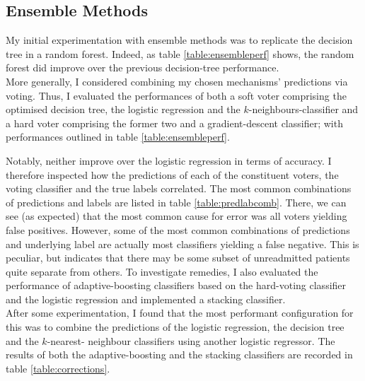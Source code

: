 \documentclass[10pt, twoside, a4paper]{article}
\begin{document}
	\subsection{Ensemble Methods}
	My initial experimentation with ensemble methods was to replicate the decision tree in a 
	random forest. Indeed, 
	as table \ref{table:ensembleperf} shows, the random forest did improve over the previous 
	decision-tree performance. \\
	More generally, I considered combining my chosen mechanisms' predictions 
	via voting. Thus, I evaluated the 
	performances of both a soft voter comprising the optimised decision tree, the logistic 
	regression and the $k$-neighbours-classifier and a hard voter comprising the former two 
	and a gradient-descent classifier; with performances outlined in table \ref{table:ensembleperf}. 

	Notably, neither improve over the logistic regression in terms of accuracy. 
	I therefore inspected how the predictions of each of the constituent voters, the voting 
	classifier and the true labels correlated. The most common combinations of 
	predictions and labels are listed in table \ref{table:predlabcomb}. There, we can see (as 
	expected) that the most common cause for error was all voters 
	yielding false positives. However, some of the most common 
	combinations of predictions and underlying label are actually most classifiers yielding a 
	false negative. This is peculiar, but indicates that there may be some subset of 
	unreadmitted patients quite separate from others. To 
	investigate remedies, I also evaluated the performance of adaptive-boosting 
	classifiers based on the hard-voting classifier and the logistic 
	regression and implemented a stacking classifier.
	\\
	After some experimentation, I found that the most performant configuration for this was to 
	combine the predictions of the logistic regression, the decision tree and the $k$-nearest-%
	neighbour classifiers using another logistic regressor. The results of both the 
	adaptive-boosting and the stacking classifiers are recorded in table 
	\ref{table:corrections}.
\end{document}
